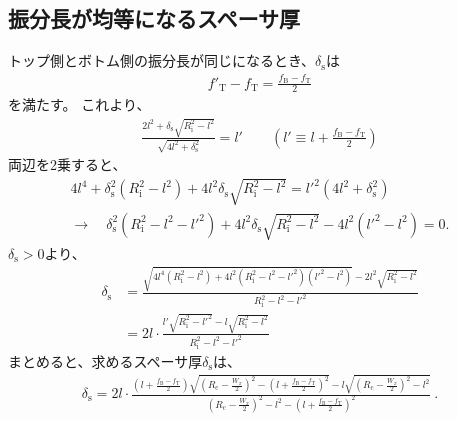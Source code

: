\subsection{振分長が均等になるスペーサ厚}
トップ側とボトム側の振分長が同じになるとき、$\delta_\mathrm s$は
\begin{align*}
  f'_\mathrm T - f_\mathrm T = \frac{f_\mathrm B - f_\mathrm T}2
\end{align*}
を満たす。
これより、
\begin{align*}
  \frac{2l^2+\delta_\mathrm s\sqrt{R_\mathrm i^2-l^2}}{\sqrt{4l^2+\delta_\mathrm s^2}} = l'\qquad
  \left(l' \equiv l + \frac{f_\mathrm B-f_\mathrm T}2\right)
\end{align*}
両辺を2乗すると、
\begin{gather*}
  4l^4+\delta_\mathrm s^2\left(R_\mathrm i^2-l^2\right)+4l^2\delta_\mathrm s\sqrt{R_\mathrm i^2-l^2}
  = l'^2\left(4l^2+\delta_\mathrm s^2\right)\\
  \longrightarrow\quad
  \delta_\mathrm s^2\left(R_\mathrm i^2-l^2-l'^2\right)
  +4l^2\delta_\mathrm s\sqrt{R_\mathrm i^2-l^2} -4l^2\left(l'^2 - l^2\right)
  = 0.
\end{gather*}
$\delta_\mathrm s > 0$より、
\begin{align*}
  \delta_\mathrm s
  &= \frac{\sqrt{4l^4\left(R_\mathrm i^2-l^2\right)
                 +4l^2\left(R_\mathrm i^2-l^2-l'^2\right)\left(l'^2 - l^2\right)}
           -2l^2\sqrt{R_\mathrm i^2-l^2}}{R_\mathrm i^2-l^2-l'^2}\\
  &= 2l\cdot\frac{l'\sqrt{R_\mathrm i^2-l'^2}-l\sqrt{R_\mathrm i^2-l^2}}{R_\mathrm i^2-l^2-l'^2}
\end{align*}
まとめると、求めるスペーサ厚$\delta_\mathrm s$は、
\begin{align*}
  \delta_\mathrm s
  = 2l\cdot
    \frac{\displaystyle
          \left(l+\frac{f_\mathrm B-f_\mathrm T}2\right)\!
          \sqrt{\left(R_\mathrm c-\frac{W_x}2\right)^{\!\!2}
                -\left(l+\frac{f_\mathrm B-f_\mathrm T}2\right)^{\!\!2}}
          -l\sqrt{\left(R_\mathrm c-\frac{W_x}2\right)^{\!\!2}-l^2}}
         {\displaystyle
          \left(R_\mathrm c-\frac{W_x}2\right)^{\!\!2}-l^2
          -\left(l+\frac{f_\mathrm B-f_\mathrm T}2\right)^{\!\!2}}~.
\end{align*}




